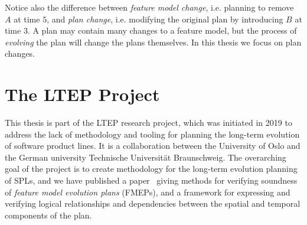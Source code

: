 Notice also the difference between \emph{feature model change}, i.e. planning to remove $A$ at time $5$, and \emph{plan change}, i.e. modifying the original plan by introducing $B$ at time 3. A plan may contain many changes to a feature model, but the process of \emph{evolving} the plan will change the plans themselves. In this thesis we focus on plan changes.

\section{The LTEP Project}
\label{sec:the-ltep-project}
This thesis is part of the LTEP research project, which was initiated in 2019 to address the lack of methodology and tooling for planning the long-term evolution of software product lines. It is a collaboration between the University of Oslo and the German university Technische Universität Braunschweig. The overarching goal of the project is to create methodology for the long-term evolution planning of SPLs, and we have published a paper~\cite{art:consistency-preserving-evolution-planning} giving methods for verifying soundness of \emph{feature model evolution plans} (FMEPs), and a framework for expressing and verifying logical relationships and dependencies between the spatial and temporal components of the plan.


